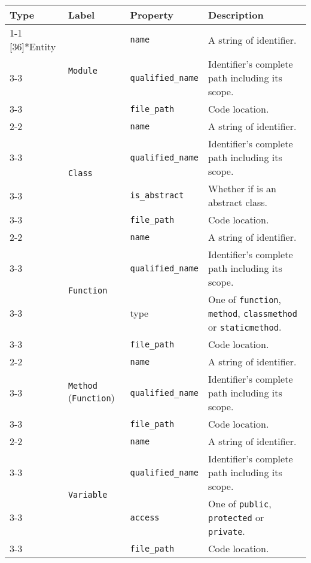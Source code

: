 \begin{tabularx}{\textwidth}{p{1.8cm}llX}
\toprule
\textbf{Type} & \textbf{Label} & \textbf{Property} & \textbf{Description} \\
\cmidrule{1-1}\cmidrule{2-2}\cmidrule{3-3}\cmidrule{4-4}
\multirow{18}[36]{*}{Entity} & \multirow{3}[6]{*}{\texttt{Module}} & \texttt{name} & A string of identifier. \\
\cmidrule{3-3}\cmidrule{4-4}
 &  & \texttt{qualified\_\texttt{name}} & Identifier's complete path including its scope. \\
\cmidrule{3-3}\cmidrule{4-4}
 &  & \texttt{file\_path} & Code location. \\
\cmidrule{2-2}\cmidrule{3-3}\cmidrule{4-4}
 & \multirow{4}[8]{*}{\texttt{Class}} & \texttt{name} & A string of identifier. \\
\cmidrule{3-3}\cmidrule{4-4}
 &  & \texttt{qualified\_\texttt{name}} & Identifier's complete path including its scope. \\
\cmidrule{3-3}\cmidrule{4-4}
 &  & \texttt{is\_abstract} & Whether if is an abstract class. \\
\cmidrule{3-3}\cmidrule{4-4}
 &  & \texttt{file\_path} & Code location. \\
\cmidrule{2-2}\cmidrule{3-3}\cmidrule{4-4}
 & \multirow{4}[8]{*}{\texttt{Function}} & \texttt{name} & A string of identifier. \\
\cmidrule{3-3}\cmidrule{4-4}
 &  & \texttt{qualified\_\texttt{name}} & Identifier's complete path including its scope. \\
\cmidrule{3-3}\cmidrule{4-4}
 &  & type & One of \texttt{function}, \texttt{method}, \texttt{class\texttt{method}} or \texttt{static\texttt{method}}. \\
\cmidrule{3-3}\cmidrule{4-4}
 &  & \texttt{file\_path} & Code location. \\
\cmidrule{2-2}\cmidrule{3-3}\cmidrule{4-4}
 & \multirow{3}[6]{*}{\texttt{Method} (\texttt{Function})} & \texttt{name} & A string of identifier. \\
\cmidrule{3-3}\cmidrule{4-4}
 &  & \texttt{qualified\_\texttt{name}} & Identifier's complete path including its scope. \\
\cmidrule{3-3}\cmidrule{4-4}
 &  & \texttt{file\_path} & Code location. \\
\cmidrule{2-2}\cmidrule{3-3}\cmidrule{4-4}
 & \multirow{4}[8]{*}{\texttt{Variable}} & \texttt{name} & A string of identifier. \\
\cmidrule{3-3}\cmidrule{4-4}
 &  & \texttt{qualified\_\texttt{name}} & Identifier's complete path including its scope. \\
\cmidrule{3-3}\cmidrule{4-4}
 &  & \texttt{access} & One of \texttt{public}, \texttt{protected} or \texttt{private}. \\
\cmidrule{3-3}\cmidrule{4-4}
 &  & \texttt{file\_path} & Code location. \\
\bottomrule
\end{tabularx}

